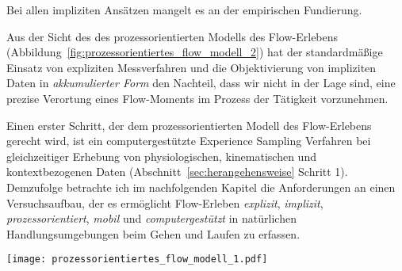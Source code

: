 Bei allen impliziten Ansätzen mangelt es an der empirischen Fundierung. 

Aus der Sicht des des prozessorientierten Modells des Flow-Erlebens (Abbildung~\ref{fig:prozessorientiertes_flow_modell_2}) hat der standardmäßige Einsatz von expliziten Messverfahren und die Objektivierung von impliziten Daten in \emph{akkumulierter Form} den Nachteil, dass wir nicht in der Lage sind, eine prezise Verortung eines Flow-Moments im Prozess der Tätigkeit vorzunehmen. 

Einen erster Schritt, der dem prozessorientierten Modell des Flow-Erlebens gerecht wird, ist ein computergestützte Experience Sampling Verfahren bei gleichzeitiger Erhebung von physiologischen, kinematischen und kontextbezogenen Daten (Abschnitt~\ref{sec:herangehensweise} Schritt 1). Demzufolge betrachte ich im nachfolgenden Kapitel die Anforderungen an einen Versuchsaufbau, der es ermöglicht Flow-Erleben \emph{explizit}, \emph{implizit}, \emph{prozessorientiert}, \emph{mobil} und \emph{computergestützt} in natürlichen Handlungsumgebungen beim Gehen und Laufen zu erfassen.

\begin{sidewaysfigure}
	\texttt{[image: prozessorientiertes\_flow\_modell\_1.pdf]} \caption[Prozessorientiertes Modell des Flow-Erlebens (erweitert)]{Prozessorientiertes Modell mit Annahmen zu implizit messbaren Auswirkungen des Flow-Erlebens} \label{fig:prozessorientiertes_flow_modell_2} 
\end{sidewaysfigure}


